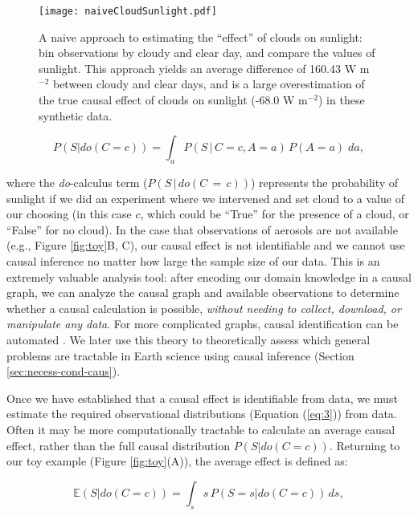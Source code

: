 \documentclass[12pt]{article}
\begin{document}
\begin{figure}
  \texttt{[image: naiveCloudSunlight.pdf]}
  \caption{A naive approach to estimating the ``effect'' of clouds on
    sunlight: bin observations by cloudy and clear day, and compare
    the values of sunlight. This approach yields an average difference
    of 160.43 W m$^{-2}$ between cloudy and clear days, and is a large
    overestimation of the true causal effect of clouds on sunlight
    (-68.0 W m$^{-2}$) in these synthetic data.}
  \label{fig:naive-cloud-sunlight}
\end{figure}

\begin{equation}
  P(S | do(C = c)) = \int_{a} P(S \, | \, C = c,
  A=a) \, P(A=a) \; da,
  \label{eq:3}
\end{equation}

where the \textit{do}-calculus \citep{pearl2009} term
($P(S \, | \, do(C\, = \,c))$) represents the probability of sunlight
if we did an experiment where we intervened and set cloud to a value
of our choosing (in this case $c$, which could be ``True'' for the
presence of a cloud, or ``False'' for no cloud). In the case that
observations of aerosols are not available (e.g., Figure
\ref{fig:toy}B, C), our causal effect is not identifiable and we
cannot use causal inference no matter how large the sample size of our
data. This is an extremely valuable analysis tool: after encoding our
domain knowledge in a causal graph, we can analyze the causal graph
and available observations to determine whether a causal calculation
is possible, \textit{without needing to collect, download, or
  manipulate any data}. For more complicated graphs, causal
identification can be automated \citep[][
\url{http://www.dagitty.net/}]{shpitser2006, textor2017}. We later use
this theory to theoretically assess which general problems are
tractable in Earth science using causal inference (Section
\ref{sec:necess-cond-caus}).

Once we have established that a causal effect is identifiable from
data, we must estimate the required observational distributions
(Equation (\ref{eq:3})) from data. Often it may be more computationally
tractable to calculate an average causal effect, rather than the full
causal distribution $P(S | do(C=c))$. Returning to our toy example
(Figure \ref{fig:toy}(A)), the average effect is defined as:

\begin{equation}
  \mathbb{E}(S | do(C = c)) = \int_{s} s \, P(S = s
  | do(C=c)) \, ds,
  \label{eq:4}
\end{equation}
\end{document}
